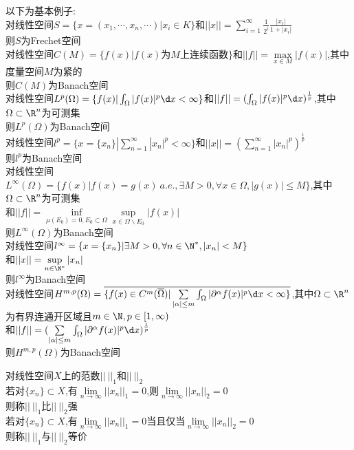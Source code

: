 \begin{zhu}
以下为基本例子:\\
对线性空间$S=\{x=(x_1,\cdots,x_n,\cdots)|x_i\in K\}$和$||x||=\sum\limits_{i=1}^{\infty}\frac{1}{2^i}\frac{|x_i|}{1+|x_i|}$\\
则$S$为Frechet空间\\
对线性空间$C(M)=\{f(x)|f(x)\text{为}M\text{上连续函数}\}$和$||f||=\max\limits_{x\in M}|f(x)|$,其中度量空间$M$为紧的\\
则$C(M)$为Banach空间\\
对线性空间$L^p(\Omega)=\{f(x)|\int_{\Omega}|f(x)|^p\d x<\infty\}$和$||f||=(\int_{\Omega}|f(x)|^p\d x)^{\frac{1}{p}}$,其中$\Omega\subset \R^n$为可测集\\
则$L^p(\Omega)$为Banach空间\\
对线性空间$l^p=\{x=\{x_n\}|\sum\limits_{n=1}^{\infty}|x_n|^p<\infty\}$和$||x||=(\sum\limits_{n=1}^{\infty}|x_n|^p)^{\frac{1}{p}}$\\
则$l^p$为Banach空间\\
对线性空间$L^{\infty}(\Omega)=\{f(x)|f(x)=g(x)\ a.e.,\exists M>0,\forall x\in \Omega,|g(x)|\leq M\}$,其中$\Omega\subset \R^n$为可测集\\
和$||f||=\inf\limits_{\mu(E_0)=0,E_0\subset \Omega}\sup\limits_{x\in\Omega\backslash E_0}|f(x)|$\\
则$L^{\infty}(\Omega)$为Banach空间\\
对线性空间$l^{\infty}=\{x=\{x_n\}|\exists M>0,\forall n\in \N^*,|x_n|<M\}$\\
和$||x||=\sup\limits_{n\in\N^*}|x_n|$\\
则$l^{\infty}$为Banach空间\\
对线性空间$H^{m,p}(\Omega)=\overline{\{f(x)\in C^{m}(\overline{\Omega})|\sum\limits_{|\alpha|\leq m}\int_{\Omega}|\partial^{\alpha}f(x)|^{p}\d x<\infty\}}$,其中$\Omega\subset \R^n$为有界连通开区域且$m\in\N, p\in[1,\infty)$\\
和$||f||=(\sum\limits_{|\alpha|\leq m}\int_{\Omega}|\partial^{\alpha}f(x)|^{p}\d x)^{\frac{1}{p}}$\\
则$H^{m,p}(\Omega)$为Banach空间
\end{zhu}

\begin{dingyi}
对线性空间$X$上的范数$||\ ||_{1}$和$||\ ||_{2}$\\
若对$\{x_n\}\subset X$,有$\lim\limits_{n\to\infty}||x_n||_{1}=0$,则$\lim\limits_{n\to\infty}||x_n||_{2}=0$\\
则称$||\ ||_{1}$比$||\ ||_{2}$强\\
若对$\{x_n\}\subset X$,有$\lim\limits_{n\to\infty}||x_n||_{1}=0$当且仅当$\lim\limits_{n\to\infty}||x_n||_{2}=0$\\
则称$||\ ||_{1}$与$||\ ||_{2}$等价
\end{dingyi}

